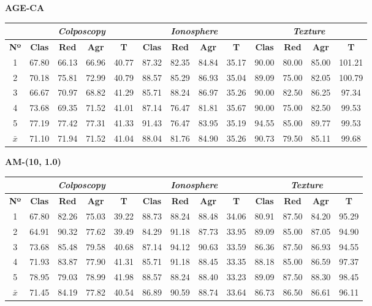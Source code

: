 \documentclass[12pt]{article}
\begin{document}
\textbf{AGE-CA}

\begin{table}[ht!]
\begin{tabular}{ccccc|cccc|cccc}
\centering
 & \multicolumn{4}{c}{\textit{Colposcopy}} & \multicolumn{4}{c}{\textit{Ionosphere}} & \multicolumn{4}{c}{\textit{Texture}} \\ \hline
\textbf{Nº} & \textbf{Clas} & \textbf{Red} & \textbf{Agr} & \textbf{T} & \textbf{Clas} & \textbf{Red} & \textbf{Agr} & \textbf{T} & \textbf{Clas} & \textbf{Red} & \textbf{Agr} & \textbf{T} \\ \hline
1 & 67.80 & 66.13 & 66.96 & 40.77 & 87.32 & 82.35 & 84.84 & 35.17 & 90.00 & 80.00 & 85.00 & 101.21 \\
2 & 70.18 & 75.81 & 72.99 & 40.79 & 88.57 & 85.29 & 86.93 & 35.04 & 89.09 & 75.00 & 82.05 & 100.79 \\
3 & 66.67 & 70.97 & 68.82 & 41.29 & 85.71 & 88.24 & 86.97 & 35.26 & 90.00 & 82.50 & 86.25 & 97.34 \\
4 & 73.68 & 69.35 & 71.52 & 41.01 & 87.14 & 76.47 & 81.81 & 35.67 & 90.00 & 75.00 & 82.50 & 99.53 \\
5 & 77.19 & 77.42 & 77.31 & 41.33 & 91.43 & 76.47 & 83.95 & 35.19 & 94.55 & 85.00 & 89.77 & 99.53 \\
\hline
$\bar{x}$ & 71.10 & 71.94 & 71.52 & 41.04 & 88.04 & 81.76 & 84.90 & 35.26 & 90.73 & 79.50 & 85.11 & 99.68 \\
\end{tabular}
\end{table}

\textbf{AM-(10, 1.0)}

\begin{table}[ht!]
\begin{tabular}{ccccc|cccc|cccc}
\centering
 & \multicolumn{4}{c}{\textit{Colposcopy}} & \multicolumn{4}{c}{\textit{Ionosphere}} & \multicolumn{4}{c}{\textit{Texture}} \\ \hline
\textbf{Nº} & \textbf{Clas} & \textbf{Red} & \textbf{Agr} & \textbf{T} & \textbf{Clas} & \textbf{Red} & \textbf{Agr} & \textbf{T} & \textbf{Clas} & \textbf{Red} & \textbf{Agr} & \textbf{T} \\ \hline
1 & 67.80 & 82.26 & 75.03 & 39.22 & 88.73 & 88.24 & 88.48 & 34.06 & 80.91 & 87.50 & 84.20 & 95.29 \\
2 & 64.91 & 90.32 & 77.62 & 39.49 & 84.29 & 91.18 & 87.73 & 33.95 & 89.09 & 85.00 & 87.05 & 94.90 \\
3 & 73.68 & 85.48 & 79.58 & 40.68 & 87.14 & 94.12 & 90.63 & 33.59 & 86.36 & 87.50 & 86.93 & 94.55 \\
4 & 71.93 & 83.87 & 77.90 & 41.31 & 85.71 & 91.18 & 88.45 & 33.35 & 88.18 & 85.00 & 86.59 & 97.37 \\
5 & 78.95 & 79.03 & 78.99 & 41.98 & 88.57 & 88.24 & 88.40 & 33.23 & 89.09 & 87.50 & 88.30 & 98.45 \\
\hline
$\bar{x}$ & 71.45 & 84.19 & 77.82 & 40.54 & 86.89 & 90.59 & 88.74 & 33.64 & 86.73 & 86.50 & 86.61 & 96.11 \\
\end{tabular}
\end{table}
\end{document}
